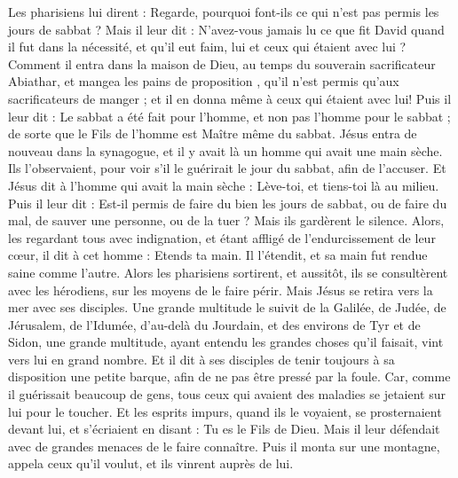 \begin{multicols}{2}
Les pharisiens lui dirent : Regarde, pourquoi font-ils ce qui n'est pas permis les jours de sabbat ?
Mais il leur dit : N'avez-vous jamais lu ce que fit David quand il fut dans la nécessité, et qu'il eut faim, lui et ceux qui étaient avec lui ?
Comment il entra dans la maison de Dieu, au temps du souverain sacrificateur Abiathar, et mangea les pains de proposition{} , qu’il n'est permis qu'aux sacrificateurs de manger ; et il en donna même à ceux qui étaient avec lui!
Puis il leur dit : Le sabbat a été fait pour l'homme, et non pas l'homme pour le sabbat ;
de sorte que le Fils de l'homme est Maître même du sabbat.
\VerseOne{}Jésus entra de nouveau dans la synagogue, et il y avait là un homme qui avait une main sèche.
Ils l'observaient, pour voir s'il le guérirait le jour du sabbat, afin de l'accuser.
Et Jésus dit à l'homme qui avait la main sèche : Lève-toi, et tiens-toi là au milieu.
Puis il leur dit : Est-il permis de faire du bien les jours de sabbat, ou de faire du mal, de sauver une personne, ou de la tuer ? Mais ils gardèrent le silence.
Alors, les regardant tous avec indignation, et étant affligé de l'endurcissement de leur cœur, il dit à cet homme : Etends ta main. Il l'étendit, et sa main fut rendue saine comme l'autre.
Alors les pharisiens sortirent, et aussitôt, ils se consultèrent avec les hérodiens, sur les moyens de le faire périr.
Mais Jésus se retira vers la mer avec ses disciples. Une grande multitude le suivit de la Galilée,
de Judée, de Jérusalem, de l’Idumée, d’au-delà du Jourdain, et des environs de Tyr et de Sidon, une grande multitude, ayant entendu les grandes choses qu'il faisait, vint vers lui en grand nombre.
Et il dit à ses disciples de tenir toujours à sa disposition une petite barque, afin de ne pas être pressé par la foule.
Car, comme il guérissait beaucoup de gens, tous ceux qui avaient des maladies se jetaient sur lui pour le toucher.
Et les esprits impurs, quand ils le voyaient, se prosternaient devant lui, et s'écriaient en disant : Tu es le Fils de Dieu.
Mais il leur défendait avec de grandes menaces de le faire connaître.
Puis il monta sur une montagne, appela ceux qu'il voulut, et ils vinrent auprès de lui.

\end{multicols}
